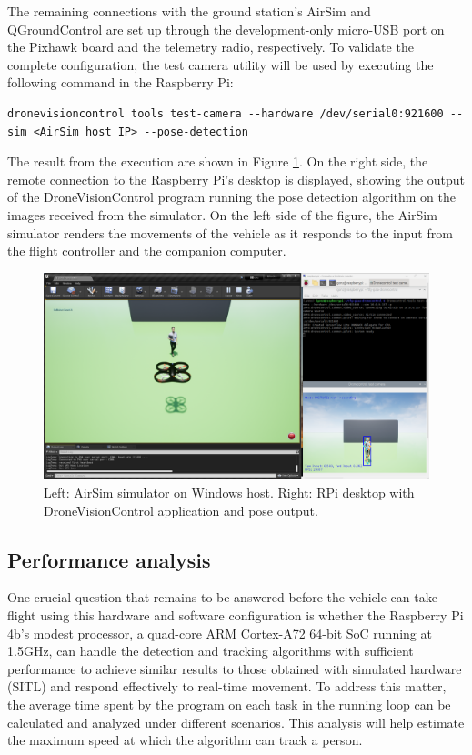 The remaining connections with the ground station's AirSim and QGroundControl are set up through the development-only micro-USB port on the Pixhawk board and the telemetry radio, respectively. To validate the complete configuration, the test camera utility will be used by executing the following command in the Raspberry Pi:

\begin{verbatim}
dronevisioncontrol tools test-camera --hardware /dev/serial0:921600 --sim <AirSim host IP> --pose-detection
\end{verbatim}

The result from the execution are shown in Figure \ref{fig:rpi-airsim-test}. On the right side, the remote connection to the Raspberry Pi's desktop is displayed, showing the output of the DroneVisionControl program running the pose detection algorithm on the images received from the simulator. On the left side of the figure, the AirSim simulator renders the movements of the vehicle as it responds to the input from the flight controller and the companion computer.

\begin{figure}
  \centering
  \includegraphics[width=\textwidth, keepaspectratio]{img/airsim-rpi-test.png}
  \caption{Left: AirSim simulator on Windows host. Right: RPi desktop with DroneVisionControl application and pose output.}
  \label{fig:rpi-airsim-test}
\end{figure}




\subsection{Performance analysis}
\label{subsec:performance}

One crucial question that remains to be answered before the vehicle can take flight using this hardware and software configuration is whether the Raspberry Pi 4b's modest processor, a quad-core ARM Cortex-A72 64-bit SoC running at 1.5GHz, can handle the detection and tracking algorithms with sufficient performance to achieve similar results to those obtained with simulated hardware (SITL) and respond effectively to real-time movement. To address this matter, the average time spent by the program on each task in the running loop can be calculated and analyzed under different scenarios. This analysis will help estimate the maximum speed at which the algorithm can track a person.


